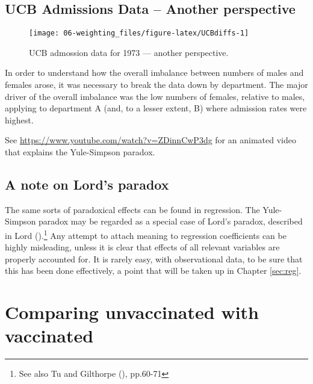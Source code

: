 \documentclass[
  10ptls,
  b5paper]{book}
\begin{document}
\subsection*{UCB Admissions Data -- Another perspective}\label{ucb-admissions-data-another-perspective}

\begin{figure}[H]

{\centering \texttt{[image: 06-weighting\_files/figure-latex/UCBdiffs-1]} 

}

\caption{UCB admossion data for 1973 --- another perspective.}\label{fig:UCBdiffs}
\end{figure}

In order to understand how the overall imbalance between numbers of males and females arose, it was necessary to break the data down by department. The major driver of the overall imbalance was the low numbers of females, relative to males, applying to department A (and, to a lesser extent, B) where admission rates were highest.

See \url{https://www.youtube.com/watch?v=ZDinnCwP3dg} for an animated video that explains the Yule-Simpson paradox.

\subsection*{A note on Lord's paradox}\label{a-note-on-lords-paradox}

The same sorts of paradoxical effects can be found in regression. The Yule-Simpson paradox may be regarded as a special case of Lord's paradox, described in Lord ().\footnote{See also Tu and Gilthorpe (), pp.60-71} Any attempt to attach meaning to regression coefficients can be highly misleading, unless it is clear that effects of all relevant variables are properly accounted for. It is rarely easy, with observational data, to be sure that this has been done effectively, a point that will be taken up in Chapter \ref{sec:reg}.

\section{Comparing unvaccinated with vaccinated}\label{comparing-unvaccinated-with-vaccinated}
\end{document}
